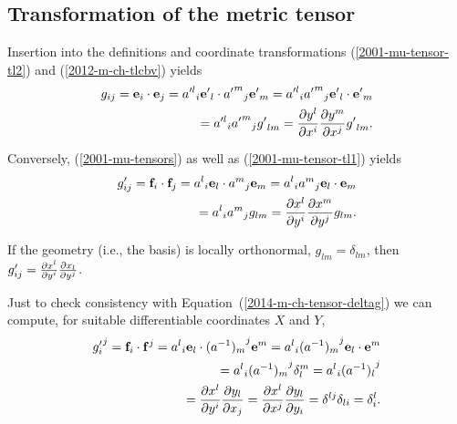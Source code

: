 \subsection{Transformation of the metric tensor}

Insertion into the definitions and coordinate transformations
 (\ref{2001-mu-tensor-tl2}) and (\ref{2012-m-ch-tlcbv})
yields
\begin{equation}
\begin{split}
g_{ij}={\bf e}_i\cdot {\bf e}_j
={a'^l}_i{\bf e'}_l\cdot {{a'}^m}_j{\bf e'}_m
={a'^l}_i{{a'}^m}_j {\bf e'}_l\cdot {\bf e'}_m \\
= {a'^l}_i{{a'}^m}_j  {g'}_{lm}
= {\partial { y }^l\over \partial x^i}{\partial { y }^m\over \partial x^j} {g'}_{lm}
.
\label{2011-m-emtdc}
\end{split}
\end{equation}

Conversely,  (\ref{2001-mu-tensors}) as well as    (\ref{2001-mu-tensor-tl1})
yields
\begin{equation}
\begin{split}
g'_{ij}={\bf f}_i\cdot {\bf f}_j
={a^l}_i{\bf e}_l\cdot {a^m}_j{\bf e}_m
={a^l}_i {a^m}_j {\bf e}_l\cdot {\bf e}_m  \\
= {a^l}_i {a^m}_j  {g}_{lm}
= {\partial {x}^l\over \partial { y }^i}{\partial {x}^m\over \partial { y }^j} {g}_{lm}
.
\end{split}
\label{2018-mm-ch-tensor-gpijgeneral}
\end{equation}


If the geometry (i.e., the basis) is locally orthonormal, ${g}_{lm}=\delta_{lm}$,
then
$g'_{ij}={\partial {x}^l\over \partial { y }^i}{\partial {x}_l\over \partial { y }^j}$.

Just to check consistency with Equation~(\ref{2014-m-ch-tensor-deltag}) we can compute,
for suitable differentiable coordinates $X$ and $ Y $,
\begin{equation}
\begin{split}
{g'_i}^j={\bf f}_i\cdot {{\bf f}}^j
={a^l}_i{\bf e}_l\cdot {(a^{-1})_m}^j{\bf e}^m
={a^l}_i {(a^{-1})_m}^j {\bf e}_l\cdot {\bf e}^m  \\
= {a^l}_i {(a^{-1})_m}^j \delta_l^m
= {a^l}_i {(a^{-1})_l}^j  \\
= {\partial {x}^l\over \partial { y }^i}{\partial { y }_l\over \partial {x}_j}
= {\partial {x}^l\over \partial {x}^j}{\partial { y }_l\over \partial { y }_i}
= \delta^{lj}\delta_{li}
= \delta^l_i
.
\end{split}
\end{equation}

